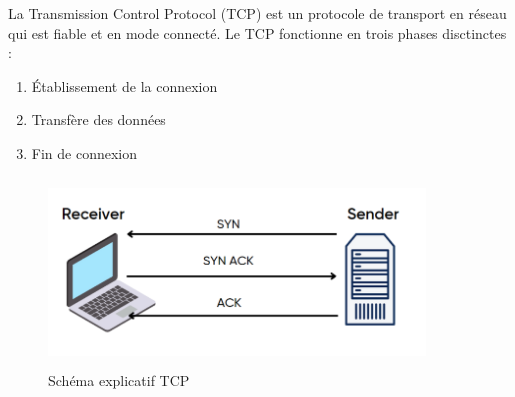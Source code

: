 La Transmission Control Protocol (TCP) est un protocole de transport en réseau qui est fiable et en mode connecté.
Le TCP fonctionne en trois phases disctinctes :
\begin{enumerate}
    \item Établissement de la connexion
    \item Transfère des données
    \item Fin de connexion
\end{enumerate}
\begin{figure}[h]
    \centering
    \includegraphics[width=100mm, height=50mm]{images/TCP.png}
    \caption{Schéma explicatif TCP}
    \label{img:mesh13}
\end{figure}
\newpage
